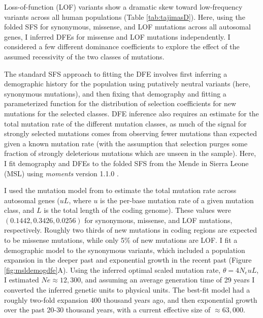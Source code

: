 \documentclass[]{article}
\begin{document}
Loss-of-function (LOF) variants show a dramatic skew toward low-frequency
variants across all human populations (Table \ref{tab:tajimasD}). Here, using
the folded SFS for synonymous, missense, and LOF mutations across all autosomal
genes, I inferred DFEs for missense and LOF mutations independently. I
considered a few different dominance coefficients to explore the effect of the
assumed recessivity of the two classes of mutations.

The standard SFS approach to fitting the DFE involves first inferring a
demographic history for the population using putatively neutral variants (here,
synonymous mutations), and then fixing that demography and fitting a
parameterized function for the distribution of selection coefficients for new
mutations for the selected classes. DFE inference also requires an estimate for
the total mutation rate of the different mutation classes, as much of the
signal for strongly selected mutations comes from observing fewer mutations
than expected given a known mutation rate (with the assumption that selection
purges some fraction of strongly deleterious mutations which are unseen in the
sample). Here, I fit demography and DFEs to the folded SFS from the Mende in
Sierra Leone (MSL) using \emph{moments} version 1.1.0 \citep{Jouganous2017-pq}.

I used the mutation model from \citet{Karczewski2020-le} to estimate the total
mutation rate across autosomal genes (\(uL\), where \(u\) is the per-base
mutation rate of a given mutation class, and \(L\) is the total length of the
coding genome). These values were \((0.1442, 0.3426, 0.0256)\) for synonymous,
missense, and LOF mutations, respectively. Roughly two thirds of new mutations
in coding regions are expected to be missense mutations, while only 5\% of new
mutations are LOF. I fit a demographic model to the synonymous variants, which
included a population expansion in the deeper past and exponential growth in
the recent past (Figure \ref{fig:msldemogdfe}A). Using the inferred optimal
scaled mutation rate, \(\theta=4N_euL\), I estimated \(Ne\approx12,300\), and
assuming an average generation time of 29 years I converted the inferred
genetic units to physical units. The best-fit model had a roughly two-fold
expansion 400 thousand years ago, and then exponential growth over the past
20-30 thousand years, with a current effective size of \(\approx 63,000\).
\end{document}

